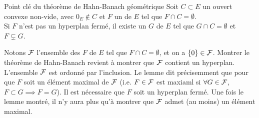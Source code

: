 \documentclass[]{report}
\begin{document}
    \begin{lm}{Point clé du théorème de Hahn-Banach géométrique}{}
        Soit $C\subset E$ un ouvert convexe non-vide, avec $0_E\not\in C$ et $F$ un \sev de $E$ tel que $F\cap C=\emptyset$.\\
        Si $F$ n'est pas un hyperplan fermé, il existe un \sev $G$ de $E$ tel que $G\cap C=\emptyset$ et $F\subsetneq G$.
    \end{lm}

    \begin{re}{}{}
        Notons $\mathcal{F}$ l'ensemble des \sev $F$ de $E$ tel que $F\cap C=\emptyset$, et on a $\{0\}\in \mathcal{F}$. Montrer le théorème de Hahn-Banach revient à montrer que $\mathcal{F}$ contient un hyperplan.\\
        L'ensemble $\mathcal{F}$ est ordonné par l'inclusion. Le lemme dit précisemment que pour que $F$ soit un élément maximal de $\mathcal{F}$ (i.e. $F\in \mathcal{F}$ est maxiaml si $\forall G\in \mathcal{F}$, $F\subset G\implies F=G$). Il est nécessaire que $F$ soit un hyperplan fermé. Une fois le lemme montré, il n'y aura plus qu'à montrer que $\mathcal{F}$ admet (au moins) un élément maximal.
    \end{re}
\end{document}

